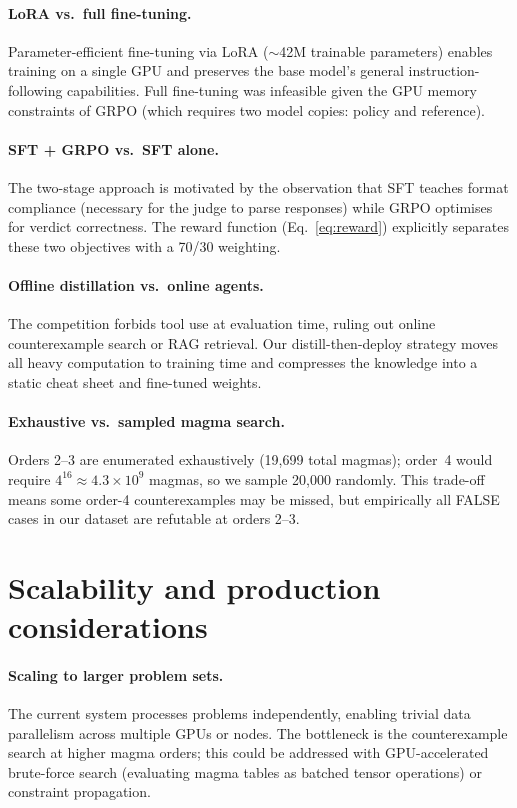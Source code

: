 \documentclass{article}
\begin{document}
\paragraph{LoRA vs.\ full fine-tuning.} Parameter-efficient fine-tuning via LoRA ($\sim$42M trainable parameters) enables training on a single GPU and preserves the base model's general instruction-following capabilities. Full fine-tuning was infeasible given the GPU memory constraints of GRPO (which requires two model copies: policy and reference).

\paragraph{SFT + GRPO vs.\ SFT alone.} The two-stage approach is motivated by the observation that SFT teaches format compliance (necessary for the judge to parse responses) while GRPO optimises for verdict correctness. The reward function (Eq.~\ref{eq:reward}) explicitly separates these two objectives with a 70/30 weighting.

\paragraph{Offline distillation vs.\ online agents.} The competition forbids tool use at evaluation time, ruling out online counterexample search or RAG retrieval. Our distill-then-deploy strategy moves all heavy computation to training time and compresses the knowledge into a static cheat sheet and fine-tuned weights.

\paragraph{Exhaustive vs.\ sampled magma search.} Orders 2--3 are enumerated exhaustively (19,699 total magmas); order~4 would require $4^{16} \approx 4.3 \times 10^9$ magmas, so we sample 20,000 randomly. This trade-off means some order-4 counterexamples may be missed, but empirically all FALSE cases in our dataset are refutable at orders 2--3.

\section{Scalability and production considerations}
\label{sec:scalability}

\paragraph{Scaling to larger problem sets.} The current system processes problems independently, enabling trivial data parallelism across multiple GPUs or nodes. The bottleneck is the counterexample search at higher magma orders; this could be addressed with GPU-accelerated brute-force search (evaluating magma tables as batched tensor operations) or constraint propagation.
\end{document}
